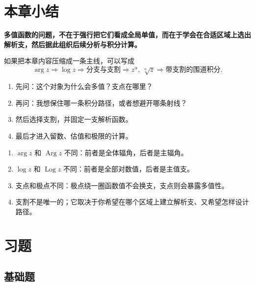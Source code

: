\section{本章小结}

\begin{tishi}[一句话回看本章]
\textbf{多值函数的问题，不在于强行把它们看成全局单值，而在于学会在合适区域上选出解析支，然后据此组织后续分析与积分计算。}
\end{tishi}

如果把本章内容压缩成一条主线，可以写成
\[
    \arg z
    \Longrightarrow
    \log z
    \Longrightarrow
    \text{分支与支割}
    \Longrightarrow
    z^\alpha,\ \sqrt[n]{z}
    \Longrightarrow
    \text{带支割的围道积分}.
\]

\begin{tishi}[做题时的判断思路]
\begin{enumerate}
    \item 先问：这个对象为什么会多值？支点在哪里？
    \item 再问：我想保住哪一条积分路径，或者想避开哪条射线？
    \item 然后选择支割，并固定一支解析函数。
    \item 最后才进入留数、估值和极限的计算。
\end{enumerate}
\end{tishi}

\begin{jinshi}[本章最容易混淆的几组概念]
\begin{enumerate}
    \item $\arg z$ 和 $\operatorname{Arg} z$ 不同：前者是全体辐角，后者是主辐角。
    \item $\log z$ 和 $\operatorname{Log} z$ 不同：前者是全部对数值，后者是主值支。
    \item 支点和极点不同：极点绕一圈函数值不会换支，支点则会暴露多值性。
    \item 支割不是唯一的；它取决于你希望在哪个区域上建立解析支、又希望怎样设计路径。
\end{enumerate}
\end{jinshi}

\section{习题}

\subsection*{基础题}

